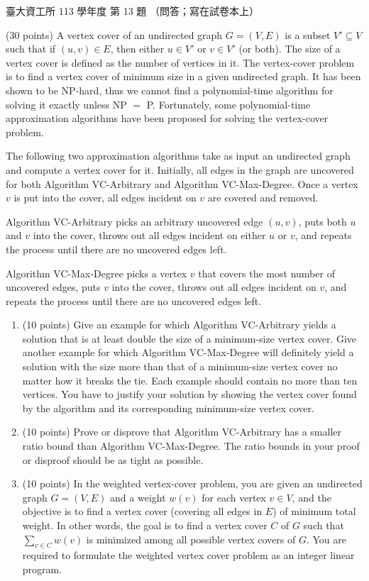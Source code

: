 \begin{pastexam}[label={px:ntu-113-dsa-13}]{臺大資工所 113 學年度 第 13 題}
（問答；寫在試卷本上）

(30 points) A vertex cover of an undirected graph $G=(V,E)$ is a subset $V'\subseteq V$ such that if
$(u,v)\in E$, then either $u\in V'$ or $v\in V'$ (or both). The size of a vertex cover is defined as
the number of vertices in it. The vertex-cover problem is to find a vertex cover of minimum size in a
given undirected graph. It has been shown to be NP-hard, thus we cannot find a polynomial-time
algorithm for solving it exactly unless NP $=$ P. Fortunately, some polynomial-time approximation
algorithms have been proposed for solving the vertex-cover problem.

The following two approximation algorithms take as input an undirected graph and compute a vertex
cover for it. Initially, all edges in the graph are uncovered for both Algorithm VC-Arbitrary and
Algorithm VC-Max-Degree. Once a vertex $v$ is put into the cover, all edges incident on $v$ are
covered and removed.

Algorithm VC-Arbitrary picks an arbitrary uncovered edge $(u,v)$, puts both $u$ and $v$ into the
cover, throws out all edges incident on either $u$ or $v$, and repeats the process until there are no
uncovered edges left.

Algorithm VC-Max-Degree picks a vertex $v$ that covers the most number of uncovered edges, puts $v$
into the cover, throws out all edges incident on $v$, and repeats the process until there are no
uncovered edges left.
\begin{enumerate}[label=(\alph*)]
\item (10 points) Give an example for which Algorithm VC-Arbitrary yields a solution that is at least
double the size of a minimum-size vertex cover. Give another example for which Algorithm
VC-Max-Degree will definitely yield a solution with the size more than that of a minimum-size vertex
cover no matter how it breaks the tie. Each example should contain no more than ten vertices. You
have to justify your solution by showing the vertex cover found by the algorithm and its
corresponding minimum-size vertex cover.
\item (10 points) Prove or disprove that Algorithm VC-Arbitrary has a smaller ratio bound than
Algorithm VC-Max-Degree. The ratio bounds in your proof or disproof should be as tight as possible.
\item (10 points) In the weighted vertex-cover problem, you are given an undirected graph $G=(V,E)$
and a weight $w(v)$ for each vertex $v\in V$, and the objective is to find a vertex cover (covering all
edges in $E$) of minimum total weight. In other words, the goal is to find a vertex cover $C$ of $G$
such that $\sum_{v\in C}w(v)$ is minimized among all possible vertex covers of $G$. You are required
to formulate the weighted vertex cover problem as an integer linear program.
\end{enumerate}
\end{pastexam}

